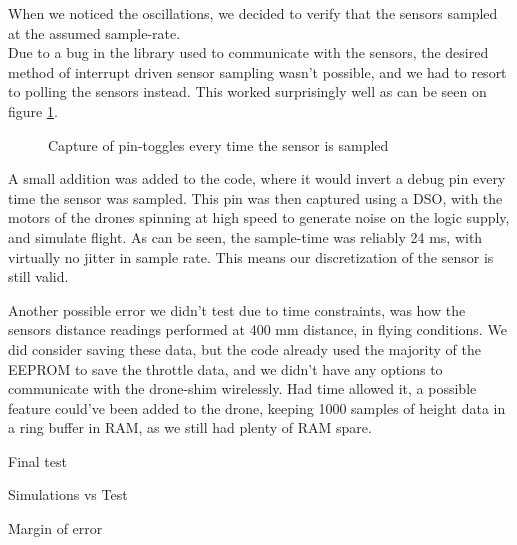 When we noticed the oscillations, we decided to verify that the sensors sampled at the assumed sample-rate.\\
Due to a bug in the library used to communicate with the sensors, the desired method of interrupt driven sensor sampling wasn't possible, and we had to resort to polling the sensors instead. This worked surprisingly well as can be seen on figure \ref{fig:sample_test}.

\begin{figure}[H]
    \centering
    \caption{Capture of pin-toggles every time the sensor is sampled}
    \label{fig:sample_test}
\end{figure}

A small addition was added to the code, where it would invert a debug pin every time the sensor was sampled. This pin was then captured using a DSO, with the motors of the drones spinning at high speed to generate noise on the logic supply, and simulate flight. As can be seen, the sample-time was reliably 24 ms, with virtually no jitter in sample rate. This means our discretization of the sensor is still valid.

Another possible error we didn't test due to time constraints, was how the sensors distance readings performed at 400 mm distance, in flying conditions. We did consider saving these data, but the code already used the majority of the EEPROM to save the throttle data, and we didn't have any options to communicate with the drone-shim wirelessly.
Had time allowed it, a possible feature could've been added to the drone, keeping 1000 samples of height data in a ring buffer in RAM, as we still had plenty of RAM spare. 

\newpage

Final test

Simulations vs Test

Margin of error




























